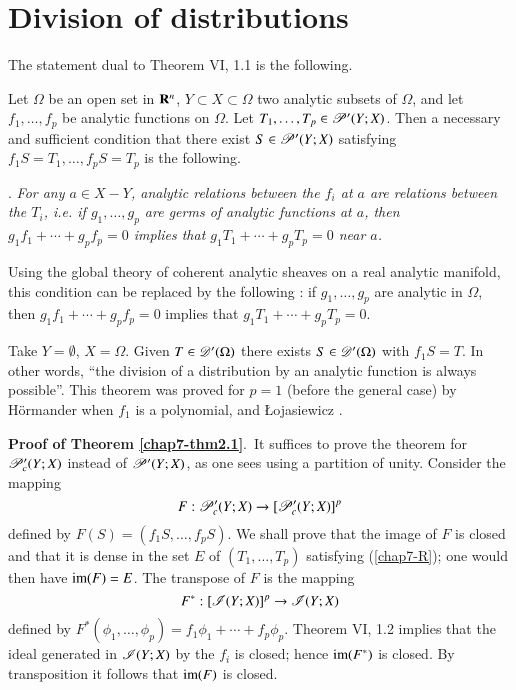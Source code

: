 \section{Division of distributions}\label{chap7-sec2}

The statement dual to Theorem VI, 1.1 is the following.

\begin{theorem}\label{chap7-thm2.1}
Let $\Omega$ be an open set in $\mathbf{R}^{n}$, $Y\subset X\subset \Omega$ two analytic subsets of $\Omega$, and let $f_{1},\ldots,f_{p}$ be analytic functions on $\Omega$. Let $T_{1},\ldots,T_{p}\in \mathscr{P}'(Y;X)$. Then a necessary and sufficient condition that there exist $S\in\mathscr{P}'(Y;X)$ satisfying $f_{1}S=T_{1},\ldots,f_{p}S=T_{p}$ is the following.
\end{theorem}

.\label{chap7-R} {\em For any $a\in X-Y$, analytic relations between the $f_{i}$ at $a$ are relations between the $T_{i}$, i.e. if $g_{1},\ldots,g_{p}$ are germs of analytic functions at $a$, then $g_{1}f_{1}+\cdots+g_{p}f_{p}=0$ implies that $g_{1}T_{1}+\cdots+g_{p}T_{p}=0$ near $a$.}

\begin{remark}\label{chap7-rem2.2}
Using the global theory of coherent analytic sheaves on a real analytic manifold, this condition can be replaced by the following : if $g_{1},\ldots,g_{p}$ are analytic in $\Omega$, then $g_{1}f_{1}+\cdots+g_{p}f_{p}=0$ implies that $g_{1}T_{1}+\cdots+g_{p}T_{p}=0$.
\end{remark}

\begin{example}\label{chap7-exam2.3}
Take $Y=\emptyset$, $X=\Omega$. Given $T\in \mathscr{D}'(\Omega)$ there exists $S\in\mathscr{D}'(\Omega)$ with $f_{1}S=T$. In other words, ``the division of a distribution by an analytic function is always possible''. This theorem was proved for $p=1$ (before the general case) by H\"ormander \cite{L. Hormander : 1} when $f_{1}$ is a polynomial, and {\L}ojasiewicz \cite{S. Lojasiewicz : 1}.
\end{example}

\noindent
{\bf Proof of Theorem \ref{chap7-thm2.1}}.~It suffices to prove the theorem for $\mathscr{P}'_{c}(Y;X)$ instead of $\mathscr{P}'(Y;X)$, as one sees using a partition of unity. Consider the mapping
$$
F:\mathscr{P}'_{c}(Y;X)\to [\mathscr{P}'_{c}(Y;X)]^{p}
$$
defined by $F(S)=(f_{1}S,\ldots,f_{p}S)$. We shall prove that the image of $F$ is closed and that it is dense in the set $E$ of $(T_{1},\ldots,T_{p})$ satisfying (\ref{chap7-R}); one would then have $\operatorname{im}(F)=E$. The transpose of $F$ is the mapping
$$
F^{*}:[\mathscr{I}(Y;X)]^{p}\to \mathscr{I}(Y;X)
$$
defined by $F^{*}(\phi_{1},\ldots,\phi_{p})=f_{1}\phi_{1}+\cdots+f_{p}\phi_{p}$. Theorem VI, 1.2 implies that the ideal generated in $\mathscr{I}(Y;X)$ by the $f_{i}$ is closed; hence $\operatorname{im}(F^{*})$ is closed. By transposition it follows that $\operatorname{im}(F)$ is closed.

